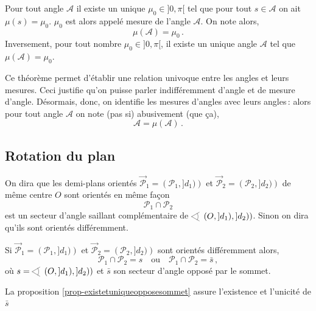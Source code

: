 \begin{thm}
Pour tout angle $\mathcal{A}$ il existe un unique $\mu_0\in ]0,\pi[$ tel que  pour tout $s \in \mathcal{A}$ on ait $\mu(s)=\mu_0$. $\mu_0$ est alors appelé mesure de l'angle $\mathcal{A}$. On note alors,
\begin{equation*}
    \mu\left(\mathcal{A}\right) = \mu_0\,. 
\end{equation*}
Inversement, pour tout nombre $\mu_0 \in ]0,\pi[$, il existe un unique angle $\mathcal{A}$ tel que $\mu\left(\mathcal{A}\right)=\mu_0$.
\end{thm}
\begin{rema}
    Ce théorème permet d'établir une relation univoque entre les angles et leurs mesures. Ceci justifie qu'on puisse parler indifféremment d'angle et de mesure d'angle. Désormais, donc, on identifie les mesures d'angles avec leurs angles\,: alors pour tout angle $\mathcal{A}$ on note (pas si) abusivement (que ça),
    \begin{equation*}
        \mathcal{A} = \mu \left(\mathcal{A}\right)\,.
    \end{equation*}
\end{rema}

        \subsection{Rotation du plan}

\begin{defi}
On dira que les demi-plans orientés $\overrightarrow{\mathcal{P}}_1 = \left(\mathcal{P}_1,]d_1)\right)$ et $\overrightarrow{\mathcal{P}}_2 = \left(\mathcal{P}_2,]d_2)\right)$ de même centre $O$ sont orientés en même façon \ssi
\begin{equation*}
    \mathcal{P}_1 \cap \mathcal{P}_2 %
\end{equation*}
est un secteur d'angle saillant complémentaire de $\anglesaillant \left(O,]d_1),]d_2)\right)$. Sinon on dira qu'ils sont orientés différemment.
\end{defi}
\begin{rema}
    Si $\overrightarrow{\mathcal{P}}_1 = \left(\mathcal{P}_1,]d_1)\right)$ et $\overrightarrow{\mathcal{P}}_2 = \left(\mathcal{P}_2,]d_2)\right)$ sont orientés différemment alors,
\begin{equation*}
    \mathcal{P}_1 \cap \mathcal{P}_2 = s \quad \text{ou}\quad \mathcal{P}_1 \cap \mathcal{P}_2 = \bar{s}\,,
\end{equation*}
où $s = \anglesaillant \left(O,]d_1),]d_2)\right)$ et $\bar{s}$ son secteur d'angle opposé par le sommet. 
\end{rema}
\begin{rema}
    La proposition \ref{prop-existetuniqueopposesommet} assure l'existence et l'unicité de $\bar{s}$
\end{rema}

